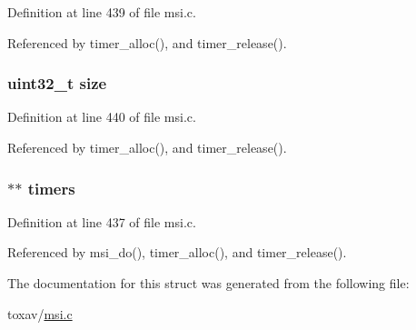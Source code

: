 Definition at line 439 of file msi.\+c.



Referenced by timer\+\_\+alloc(), and timer\+\_\+release().

\hypertarget{struct___timer_handler_ab2c6b258f02add8fdf4cfc7c371dd772}{
\subsubsection[{size}]{\setlength{\rightskip}{0pt plus 5cm}uint32\+\_\+t size}}\label{struct___timer_handler_ab2c6b258f02add8fdf4cfc7c371dd772}


Definition at line 440 of file msi.\+c.



Referenced by timer\+\_\+alloc(), and timer\+\_\+release().

\hypertarget{struct___timer_handler_af6a69553fb8462326147c121a4c3e98c}{
\subsubsection[{timers}]{$\ast$$\ast$ timers}}\label{struct___timer_handler_af6a69553fb8462326147c121a4c3e98c}


Definition at line 437 of file msi.\+c.



Referenced by msi\+\_\+do(), timer\+\_\+alloc(), and timer\+\_\+release().



The documentation for this struct was generated from the following file\+:\begin{DoxyCompactItemize}
\item 
toxav/\hyperlink{msi_8c}{msi.\+c}\end{DoxyCompactItemize}

